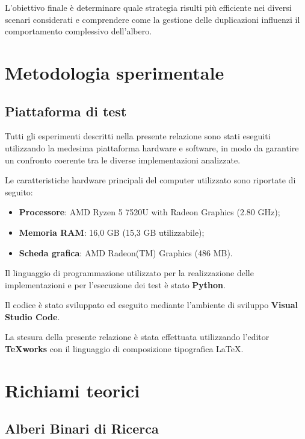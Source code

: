 \documentclass[a4paper,12pt]{article}
\begin{document}
L'obiettivo finale è determinare quale strategia risulti più efficiente nei diversi scenari considerati e comprendere come la gestione delle duplicazioni influenzi il comportamento complessivo dell'albero.

\section{Metodologia sperimentale}

\subsection{Piattaforma di test}

Tutti gli esperimenti descritti nella presente relazione sono stati eseguiti utilizzando la medesima piattaforma hardware e software, in modo da garantire un confronto coerente tra le diverse implementazioni analizzate.

Le caratteristiche hardware principali del computer utilizzato sono riportate di seguito:

\begin{itemize}

    \item \textbf{Processore}: AMD Ryzen 5 7520U with Radeon Graphics (2.80 GHz);

    \item \textbf{Memoria RAM}: 16,0 GB (15,3 GB utilizzabile);

    \item \textbf{Scheda grafica}: AMD Radeon(TM) Graphics (486 MB).

\end{itemize}

Il linguaggio di programmazione utilizzato per la realizzazione delle implementazioni e per l'esecuzione dei test è stato \textbf{Python}.

Il codice è stato sviluppato ed eseguito mediante l'ambiente di sviluppo \textbf{Visual Studio Code}.

La stesura della presente relazione è stata effettuata utilizzando l'editor \textbf{TeXworks} con il linguaggio di composizione tipografica \LaTeX.

\section{Richiami teorici}

\subsection{Alberi Binari di Ricerca}
\end{document}
